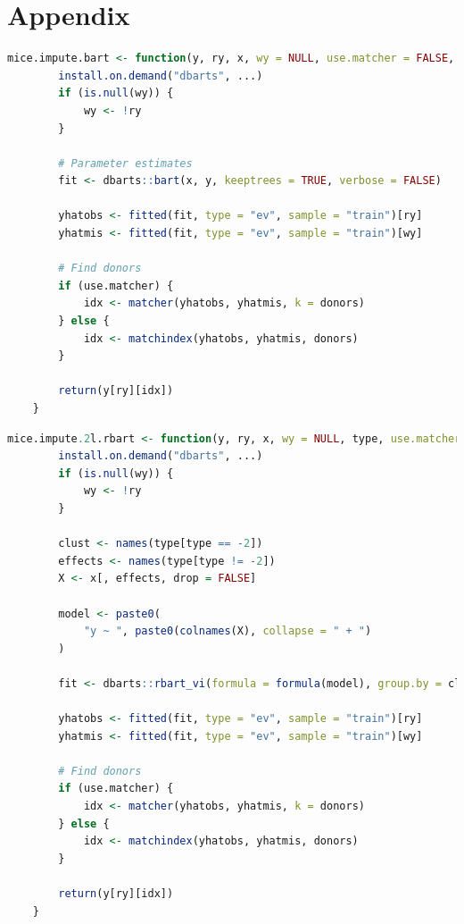 \documentclass[10pt, a4paper, titlepage]{article}
\begin{document}
\section{Appendix}
\begin{lstlisting}[language=R, caption = {Imputation function for single-level BART}, label = {lst:singlelevelBART}]
    mice.impute.bart <- function(y, ry, x, wy = NULL, use.matcher = FALSE, donors = 5L, ...) {
        install.on.demand("dbarts", ...)
        if (is.null(wy)) {
            wy <- !ry
        }
    
        # Parameter estimates
        fit <- dbarts::bart(x, y, keeptrees = TRUE, verbose = FALSE)
    
        yhatobs <- fitted(fit, type = "ev", sample = "train")[ry]
        yhatmis <- fitted(fit, type = "ev", sample = "train")[wy]
    
        # Find donors
        if (use.matcher) {
            idx <- matcher(yhatobs, yhatmis, k = donors)
        } else {
            idx <- matchindex(yhatobs, yhatmis, donors)
        }
    
        return(y[ry][idx])
    }
\end{lstlisting}
\begin{lstlisting}[language=R, caption={Imputation function for random intercept BART}, label={lst:randominterceptBART}]
    mice.impute.2l.rbart <- function(y, ry, x, wy = NULL, type, use.matcher = FALSE, donors = 5L, ...) {
        install.on.demand("dbarts", ...)
        if (is.null(wy)) {
            wy <- !ry
        }
    
        clust <- names(type[type == -2])
        effects <- names(type[type != -2])
        X <- x[, effects, drop = FALSE]
    
        model <- paste0(
            "y ~ ", paste0(colnames(X), collapse = " + ")
        )
    
        fit <- dbarts::rbart_vi(formula = formula(model), group.by = clust, data = data.frame(y, x), verbose = FALSE, n.threads = 1, n.samples = 500L, n.burn = 500L, ...)
    
        yhatobs <- fitted(fit, type = "ev", sample = "train")[ry]
        yhatmis <- fitted(fit, type = "ev", sample = "train")[wy]
    
        # Find donors
        if (use.matcher) {
            idx <- matcher(yhatobs, yhatmis, k = donors)
        } else {
            idx <- matchindex(yhatobs, yhatmis, donors)
        }
    
        return(y[ry][idx])
    }
\end{lstlisting}
\end{document}
